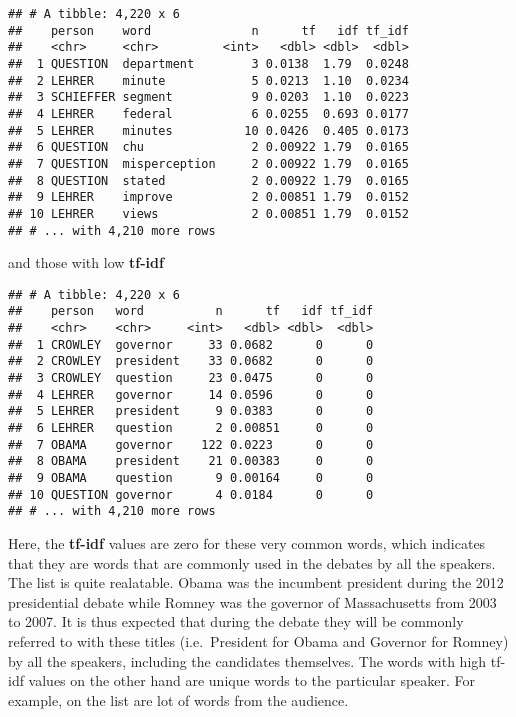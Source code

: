 \documentclass[
]{article}
\newenvironment{Shaded}{\begin{snugshade}}{\end{snugshade}}
\newcommand{\KeywordTok}[1]{\textcolor[rgb]{0.13,0.29,0.53}{\textbf{#1}}}
\newcommand{\NormalTok}[1]{#1}
\newcommand{\OperatorTok}[1]{\textcolor[rgb]{0.81,0.36,0.00}{\textbf{#1}}}
\newcommand{\StringTok}[1]{\textcolor[rgb]{0.31,0.60,0.02}{#1}}
\begin{document}
\begin{verbatim}
## # A tibble: 4,220 x 6
##    person    word              n      tf   idf tf_idf
##    <chr>     <chr>         <int>   <dbl> <dbl>  <dbl>
##  1 QUESTION  department        3 0.0138  1.79  0.0248
##  2 LEHRER    minute            5 0.0213  1.10  0.0234
##  3 SCHIEFFER segment           9 0.0203  1.10  0.0223
##  4 LEHRER    federal           6 0.0255  0.693 0.0177
##  5 LEHRER    minutes          10 0.0426  0.405 0.0173
##  6 QUESTION  chu               2 0.00922 1.79  0.0165
##  7 QUESTION  misperception     2 0.00922 1.79  0.0165
##  8 QUESTION  stated            2 0.00922 1.79  0.0165
##  9 LEHRER    improve           2 0.00851 1.79  0.0152
## 10 LEHRER    views             2 0.00851 1.79  0.0152
## # ... with 4,210 more rows
\end{verbatim}

and those with low \textbf{tf-idf}

\begin{Shaded}
\end{Shaded}

\begin{verbatim}
## # A tibble: 4,220 x 6
##    person   word          n      tf   idf tf_idf
##    <chr>    <chr>     <int>   <dbl> <dbl>  <dbl>
##  1 CROWLEY  governor     33 0.0682      0      0
##  2 CROWLEY  president    33 0.0682      0      0
##  3 CROWLEY  question     23 0.0475      0      0
##  4 LEHRER   governor     14 0.0596      0      0
##  5 LEHRER   president     9 0.0383      0      0
##  6 LEHRER   question      2 0.00851     0      0
##  7 OBAMA    governor    122 0.0223      0      0
##  8 OBAMA    president    21 0.00383     0      0
##  9 OBAMA    question      9 0.00164     0      0
## 10 QUESTION governor      4 0.0184      0      0
## # ... with 4,210 more rows
\end{verbatim}

Here, the \textbf{tf-idf} values are zero for these very common words,
which indicates that they are words that are commonly used in the
debates by all the speakers. The list is quite realatable. Obama was the
incumbent president during the 2012 presidential debate while Romney was
the governor of Massachusetts from 2003 to 2007. It is thus expected
that during the debate they will be commonly referred to with these
titles (i.e.~President for Obama and Governor for Romney) by all the
speakers, including the candidates themselves. The words with high
tf-idf values on the other hand are unique words to the particular
speaker. For example, on the list are lot of words from the audience.
\end{document}
